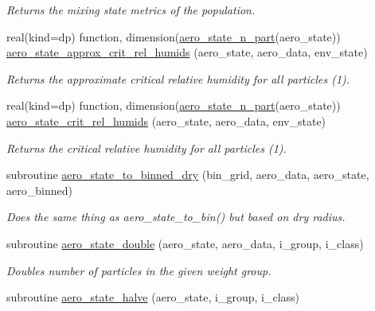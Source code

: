 \begin{DoxyCompactItemize}
\begin{DoxyCompactList}\small\item\em Returns the mixing state metrics of the population. \end{DoxyCompactList}\item 
real(kind=dp) function, dimension(\mbox{\hyperlink{namespacepmc__aero__state_a94155bf7fa94e7c3ab722a5a1dacac98}{aero\+\_\+state\+\_\+n\+\_\+part}}(aero\+\_\+state)) \mbox{\hyperlink{namespacepmc__aero__state_a24a909f4a78590222a3d1f940e2e6863}{aero\+\_\+state\+\_\+approx\+\_\+crit\+\_\+rel\+\_\+humids}} (aero\+\_\+state, aero\+\_\+data, env\+\_\+state)
\begin{DoxyCompactList}\small\item\em Returns the approximate critical relative humidity for all particles (1). \end{DoxyCompactList}\item 
real(kind=dp) function, dimension(\mbox{\hyperlink{namespacepmc__aero__state_a94155bf7fa94e7c3ab722a5a1dacac98}{aero\+\_\+state\+\_\+n\+\_\+part}}(aero\+\_\+state)) \mbox{\hyperlink{namespacepmc__aero__state_a1618326e97d290803c642af677073d9c}{aero\+\_\+state\+\_\+crit\+\_\+rel\+\_\+humids}} (aero\+\_\+state, aero\+\_\+data, env\+\_\+state)
\begin{DoxyCompactList}\small\item\em Returns the critical relative humidity for all particles (1). \end{DoxyCompactList}\item 
subroutine \mbox{\hyperlink{namespacepmc__aero__state_a9618d3e95a4e97e71b154586a2c8bc25}{aero\+\_\+state\+\_\+to\+\_\+binned\+\_\+dry}} (bin\+\_\+grid, aero\+\_\+data, aero\+\_\+state, aero\+\_\+binned)
\begin{DoxyCompactList}\small\item\em Does the same thing as aero\+\_\+state\+\_\+to\+\_\+bin() but based on dry radius. \end{DoxyCompactList}\item 
subroutine \mbox{\hyperlink{namespacepmc__aero__state_a061271c7cf7c3592bb385c1b7bfbedfc}{aero\+\_\+state\+\_\+double}} (aero\+\_\+state, aero\+\_\+data, i\+\_\+group, i\+\_\+class)
\begin{DoxyCompactList}\small\item\em Doubles number of particles in the given weight group. \end{DoxyCompactList}\item 
subroutine \mbox{\hyperlink{namespacepmc__aero__state_ac5109f61fd1f0631a218a410154da5c1}{aero\+\_\+state\+\_\+halve}} (aero\+\_\+state, i\+\_\+group, i\+\_\+class)

\end{DoxyCompactItemize}
